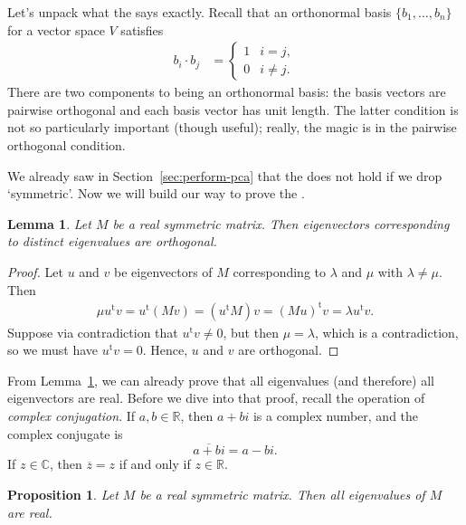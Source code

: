 \documentclass[a4paper, 12pt]{article}
\numberwithin{equation}{section}
\numberwithin{figure}{section}
\newtheorem{lem}[thm]{Lemma}
\newtheorem{prop}[thm]{Proposition}
\theoremstyle{definition}
\newcommand{\R}{\mathbb{R}}
\newcommand{\C}{\mathbb{C}}
\newcommand{\tr}{\mathrm{t}}
\begin{document}
Let's unpack what the  says exactly. Recall that an
orthonormal basis $\{b_1, \dots, b_n\}$ for a vector space $V$ satisfies 
\begin{align*}
	b_i \cdot b_j &= \begin{cases}
		1 & i = j, \\ 0 & i \neq j. 
	\end{cases}
\end{align*}
There are two components to being an orthonormal basis: the basis vectors are
pairwise orthogonal and each basis vector has unit length. The latter condition
is not so particularly important (though useful); really, the magic is in the
pairwise orthogonal condition. 

We already saw in Section~\ref{sec:perform-pca} that the 
does not hold if we drop `symmetric'. Now we will build our way to prove the
. 

\begin{lem}\label{lem:distinct-ortho}
	Let $M$ be a real symmetric matrix. Then eigenvectors corresponding to
	distinct eigenvalues are orthogonal. 
\end{lem}

\begin{proof}
	Let $u$ and $v$ be eigenvectors of $M$ corresponding to $\lambda$ and $\mu$
	with $\lambda\neq \mu$. Then 
	\begin{align*}
		\mu u^{\tr} v = u^{\tr}(M v) = (u^{\tr}M)v = (Mu)^{\tr}v = \lambda u^{\tr}v. 
	\end{align*}
	Suppose via contradiction that $u^{\tr} v \neq 0$, but then $\mu=\lambda$,
	which is a contradiction, so we must have $u^{\tr} v = 0$. Hence, $u$ and
	$v$ are orthogonal.
\end{proof}

From Lemma~\ref{lem:distinct-ortho}, we can already prove that all eigenvalues (and
therefore) all eigenvectors are real. Before we dive into that proof, recall the
operation of \textit{complex conjugation}. If $a,b\in \R$, then $a + bi$ is a
complex number, and the complex conjugate is 
\[ 
	\overline{a + bi} = a - bi.
\] 
If $z\in \C$, then $\overline{z} = z$ if and only if $z\in \R$.

\begin{prop}\label{prop:real-evals}
	Let $M$ be a real symmetric matrix. Then all eigenvalues of $M$ are real.
\end{prop}
\end{document}
